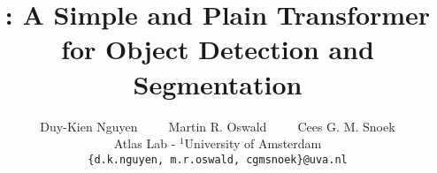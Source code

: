 \documentclass[10pt,twocolumn,letterpaper]{article}
\title{\ours: A Simple and Plain Transformer for Object Detection and Segmentation}
\author{Duy-Kien Nguyen~~~~~Martin R. Oswald~~~~~Cees G. M. Snoek \\
{\normalsize Atlas Lab - $^1$University of Amsterdam}\\
{\tt\small \{d.k.nguyen, m.r.oswald, cgmsnoek\}@uva.nl}
}
\begin{document}
\maketitle










{
    \small
    
    
}

% 
\end{document}
